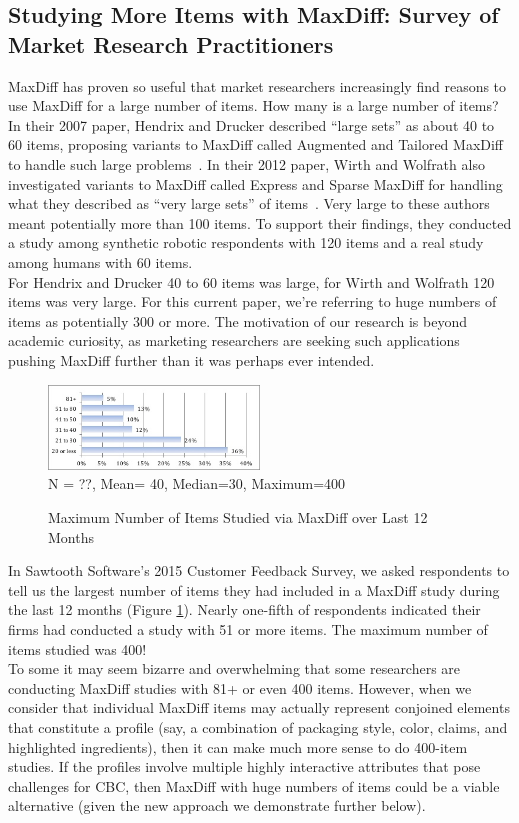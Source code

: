 \documentclass[nonblindrev]{informs3}
\begin{document}
\subsection{Studying More Items with MaxDiff: Survey of Market Research Practitioners}
MaxDiff has proven so useful that market researchers increasingly find reasons to use MaxDiff for a large number of items.  How many is a large number of items?  In their 2007 paper, Hendrix and Drucker described ``large sets'' as about 40 to 60 items, proposing variants to MaxDiff called Augmented and Tailored MaxDiff to handle such large problems~\cite{hendrix2007alternative}. In their 2012 paper, Wirth and Wolfrath also investigated variants to MaxDiff called Express and Sparse MaxDiff for handling what they described as ``very large sets'' of items~\cite{wirth2012largeset}.  Very large to these authors meant potentially more than 100 items.  To support their findings, they conducted a study among synthetic robotic respondents with 120 items and a real study among humans with 60 items.\\
For Hendrix and Drucker 40 to 60 items was large, for Wirth and Wolfrath 120 items was very large.  For this current paper, we're referring to huge numbers of items as potentially 300 or more. The motivation of our research is beyond academic curiosity, as marketing researchers are seeking such applications pushing MaxDiff further than it was perhaps ever intended. \\
\begin{figure}
\caption{Maximum Number of Items Studied via MaxDiff over Last 12 Months}
\includegraphics[width=0.5\textwidth]{plots/maxnumstudy}\\
N = ??, Mean= 40, Median=30, Maximum=400
\label{fig:max}
\end{figure}
In Sawtooth Software's 2015 Customer Feedback Survey, we asked respondents to tell us the largest number of items they had included in a MaxDiff study during the last 12 months (Figure \ref{fig:max}). Nearly one-fifth of respondents indicated their firms had conducted a study with 51 or more items.  The maximum number of items studied was 400!\\
To some it may seem bizarre and overwhelming that some researchers are conducting MaxDiff studies with 81+ or even 400 items.  However, when we consider that individual MaxDiff items may actually represent conjoined elements that constitute a profile (say, a combination of packaging style, color, claims, and highlighted ingredients), then it can make much more sense to do 400-item studies.  If the profiles involve multiple highly interactive attributes that pose challenges for CBC, then MaxDiff with huge numbers of items could be a viable alternative (given the new approach we demonstrate further below).\\
\end{document}
